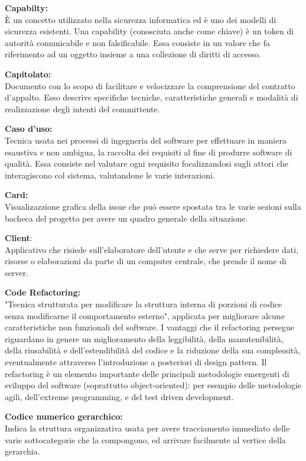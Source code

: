 \documentclass[a4paper, oneside, openany, dvipsnames, table]{article}
\begin{document}
\textbf{Capabilty:}\\ \`E un concetto utilizzato nella sicurezza informatica ed è uno dei modelli di sicurezza esistenti. Una capability (conosciuta anche come chiave) è un token di autorità comunicabile e non falsificabile. Essa consiste in un valore che fa riferimento ad un oggetto insieme a una collezione di diritti di accesso. 

\textbf{Capitolato:}\\	Documento con lo scopo di facilitare e velocizzare la comprensione del contratto d'appalto. Esso descrive specifiche tecniche, caratteristiche generali e modalità di realizzazione degli intenti del committente.

\textbf{Caso d'uso:}\\	Tecnica usata nei processi di ingegneria del software per effettuare in maniera esaustiva e non ambigua, la raccolta dei requisiti al fine di produrre software di qualità. Essa consiste nel valutare ogni requisito focalizzandosi sugli attori che interagiscono col sistema, valutandone le varie interazioni.
 
\textbf{Card:}\\ Visualizazzione grafica della issue che può essere spostata tra le varie sezioni sulla bacheca del progetto per avere un quadro generale della situazione.

\textbf{Client}:\\	Applicativo che risiede sull'elaboratore dell'utente e che serve per richiedere dati, risorse o elaborazioni da parte di un computer centrale, che prende il nome di server.

\textbf{Code Refactoring:}\\	"Tecnica strutturata per modificare la struttura interna di porzioni di codice senza modificarne il comportamento esterno", applicata per migliorare alcune caratteristiche non funzionali del software. I vantaggi che il refactoring persegue riguardano in genere un miglioramento della leggibilità, della manutenibilità, della riusabilità e dell'estendibilità del codice e la riduzione della sua complessità, eventualmente attraverso l'introduzione a posteriori di design pattern.
Il refactoring è un elemento importante delle principali metodologie emergenti di sviluppo del software (soprattutto object-oriented): per esempio delle metodologie agili, dell'extreme programming, e del test driven development.

\textbf{Codice numerico gerarchico:}\\  Indica la struttura organizzativa usata per avere tracciamento immediato delle varie sottocategorie che la compongono, ed  arrivare  facilmente al vertice della gerarchia.
\end{document}
